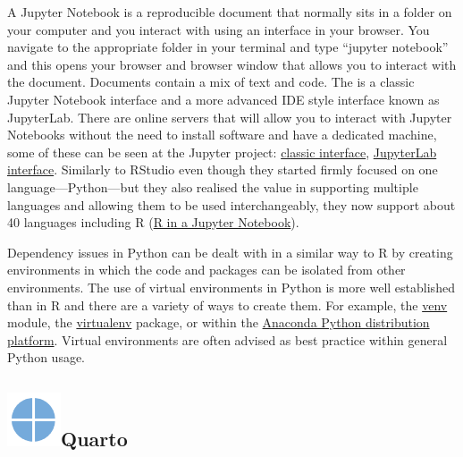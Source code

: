 \documentclass[
  letterpaper,
  DIV=11,
  numbers=noendperiod]{scrreprt}
\begin{document}
A Jupyter Notebook is a reproducible document that normally sits in a
folder on your computer and you interact with using an interface in your
browser. You navigate to the appropriate folder in your terminal and
type ``jupyter notebook'' and this opens your browser and browser window
that allows you to interact with the document. Documents contain a mix
of text and code. The is a classic Jupyter Notebook interface and a more
advanced IDE style interface known as JupyterLab. There are online
servers that will allow you to interact with Jupyter Notebooks without
the need to install software and have a dedicated machine, some of these
can be seen at the Jupyter project:
\href{https://jupyter.org/try-jupyter/retro/notebooks/?path=notebooks/Intro.ipynb}{classic
interface}, \href{https://jupyter.org/try-jupyter/lab/}{JupyterLab
interface}. Similarly to RStudio even though they started firmly focused
on one language---Python---but they also realised the value in
supporting multiple languages and allowing them to be used
interchangeably, they now support about 40 languages including R
(\href{https://mybinder.org/v2/gh/binder-examples/r/HEAD?filepath=index.ipynb}{R
in a Jupyter Notebook}).

Dependency issues in Python can be dealt with in a similar way to R by
creating environments in which the code and packages can be isolated
from other environments. The use of virtual environments in Python is
more well established than in R and there are a variety of ways to
create them. For example, the
\href{https://docs.python.org/3/library/venv.html}{venv} module, the
\href{https://pypi.org/project/virtualenv/}{virtualenv} package, or
within the
\href{https://docs.conda.io/projects/conda/en/latest/user-guide/tasks/manage-environments.html}{Anaconda
Python distribution platform}. Virtual environments are often advised as
best practice within general Python usage.

\subsection[Quarto]{\texorpdfstring{\protect\includegraphics[width=0.625in,height=\textheight]{images/Quartologo.png}Quarto}{Quarto}}\label{quarto}
\end{document}
